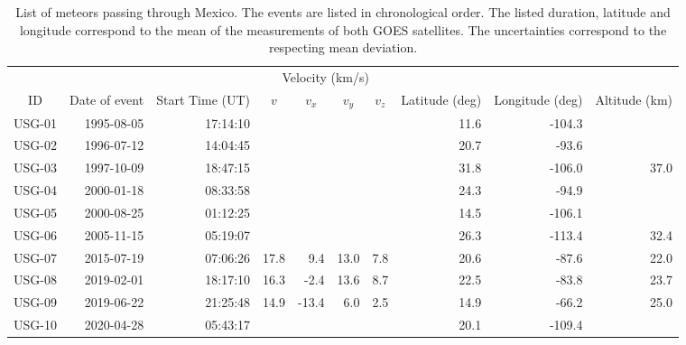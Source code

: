 \begin{table}
    \centering
  \footnotesize
  \caption{List of meteors passing through Mexico. The events are listed in chronological order. The listed duration, latitude and longitude correspond to the mean of the measurements of both GOES satellites. The uncertainties correspond to the respecting mean deviation.}
\label{tab:table-meteors}
\begin{tabular}{rrrrrrrrrr}
       &               &                  & \multicolumn{4}{c}{Velocity (km/s)}       &                   &                 &\\\cline{4-7}
\multicolumn{1}{c}{ID}&\multicolumn{1}{c}{Date of event}&\multicolumn{1}{c}{Start Time (UT)}&\multicolumn{1}{c}{$v$}&\multicolumn{1}{c}{$v_x$}&\multicolumn{1}{c}{$v_y$}&\multicolumn{1}{c}{$v_z$}&\multicolumn{1}{c}{Latitude (deg)}&\multicolumn{1}{c}{Longitude (deg)}&\multicolumn{1}{c}{Altitude (km)}\\\hline
USG-01 & 1995-08-05    & 17:14:10         &      &         &           &              & 11.6              &  -104.3         &             \\
USG-02 & 1996-07-12    & 14:04:45         &      &         &           &              & 20.7              &   -93.6         &             \\ 
USG-03 & 1997-10-09    & 18:47:15         &      &         &           &              & 31.8              &  -106.0         &   37.0      \\
USG-04 & 2000-01-18    & 08:33:58         &      &         &           &              & 24.3              &   -94.9         &             \\
USG-05 & 2000-08-25    & 01:12:25         &      &         &           &              & 14.5              &  -106.1         &             \\
USG-06 & 2005-11-15    & 05:19:07         &      &         &           &              & 26.3              &  -113.4         &   32.4      \\
USG-07 & 2015-07-19    & 07:06:26         & 17.8 &   9.4   &  13.0     & 7.8          & 20.6              &   -87.6         &   22.0      \\
USG-08 & 2019-02-01    & 18:17:10         & 16.3 &  -2.4   &  13.6     & 8.7          & 22.5              &   -83.8         &   23.7      \\
USG-09 & 2019-06-22    & 21:25:48         & 14.9 & -13.4   &   6.0     & 2.5          & 14.9              &   -66.2         &   25.0      \\
USG-10 & 2020-04-28    & 05:43:17         &      &         &           &              & 20.1              &  -109.4         &             \\\hline  
  \end{tabular}
\end{table}


